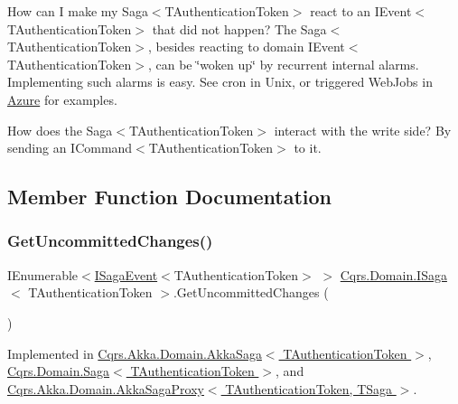 How can I make my Saga$<$\+T\+Authentication\+Token$>$ react to an I\+Event$<$\+T\+Authentication\+Token$>$ that did not happen? The Saga$<$\+T\+Authentication\+Token$>$, besides reacting to domain I\+Event$<$\+T\+Authentication\+Token$>$, can be \char`\"{}woken up\char`\"{} by recurrent internal alarms. Implementing such alarms is easy. See cron in Unix, or triggered Web\+Jobs in \hyperlink{namespaceCqrs_1_1Azure}{Azure} for examples.

How does the Saga$<$\+T\+Authentication\+Token$>$ interact with the write side? By sending an I\+Command$<$\+T\+Authentication\+Token$>$ to it. 

\subsection{Member Function Documentation}
\mbox{\label{interfaceCqrs_1_1Domain_1_1ISaga_abb77811b4f7d19adb61f9d33da18e7e0_abb77811b4f7d19adb61f9d33da18e7e0}} 
\subsubsection{\texorpdfstring{Get\+Uncommitted\+Changes()}{GetUncommittedChanges()}}
{\footnotesize\ttfamily I\+Enumerable$<$\hyperlink{interfaceCqrs_1_1Events_1_1ISagaEvent}{I\+Saga\+Event}$<$T\+Authentication\+Token$>$ $>$ \hyperlink{interfaceCqrs_1_1Domain_1_1ISaga}{Cqrs.\+Domain.\+I\+Saga}$<$ T\+Authentication\+Token $>$.Get\+Uncommitted\+Changes (\begin{DoxyParamCaption}{ }\end{DoxyParamCaption})}



Implemented in \hyperlink{classCqrs_1_1Akka_1_1Domain_1_1AkkaSaga_ac88061e29e3e2223db31ce9075835b46_ac88061e29e3e2223db31ce9075835b46}{Cqrs.\+Akka.\+Domain.\+Akka\+Saga$<$ T\+Authentication\+Token $>$}, \hyperlink{classCqrs_1_1Domain_1_1Saga_a043e8e21e7550c34f5848af7a87e33cd_a043e8e21e7550c34f5848af7a87e33cd}{Cqrs.\+Domain.\+Saga$<$ T\+Authentication\+Token $>$}, and \hyperlink{classCqrs_1_1Akka_1_1Domain_1_1AkkaSagaProxy_a8cad3415bc5474a01bfdb2db3a852ea5_a8cad3415bc5474a01bfdb2db3a852ea5}{Cqrs.\+Akka.\+Domain.\+Akka\+Saga\+Proxy$<$ T\+Authentication\+Token, T\+Saga $>$}.

